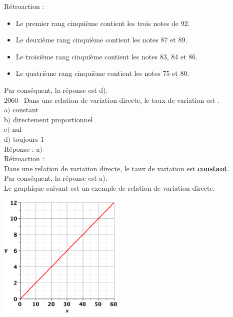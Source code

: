 \documentclass[letterpaper, 12pt]{article}
\begin{document}
R\'etroaction :\\
\begin{itemize}
 \item Le premier rang cinqui\`eme contient les trois notes de 92. \\
\item Le deuxi\`eme rang cinqui\`eme contient les notes 87 et 89.\\
\item Le troisi\`eme rang cinqui\`eme contient les notes 83, 84 et 86. \\
\item Le quatri\`eme rang cinqui\`eme contient les notes 75 et 80.\\
\end{itemize}
Par cons\'equent, la r\'eponse est d).\\

2060-- Dans une relation de variation directe, le taux de variation est \underline{\qquad\qquad}. \\

a$)$ constant \\
b$)$ directement proportionnel\\
c$)$ nul\\
d$)$ toujours 1\\

R\'eponse : a$)$ \\

R\'etroaction :\\
Dans une relation de variation directe, le taux de variation est \underline{\textbf{constant}}.\\
Par cons\'equent, la r\'eponse est a).\\
Le graphique suivant est un exemple de relation de variation directe.\\
\begin{center}
 \includegraphics[width=6cm,bb=20 118 575 673]{Q2064.eps}
\end{center}
\end{document}
